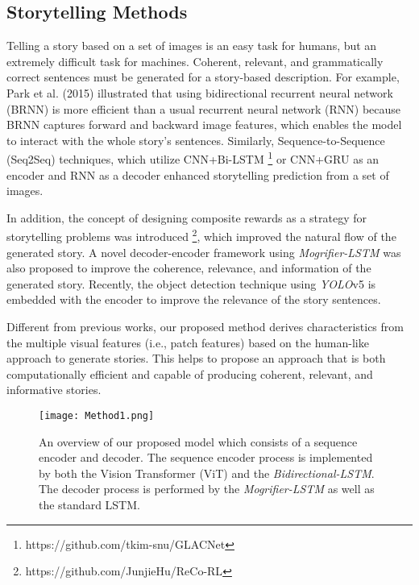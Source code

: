 \documentclass[runningheads]{llncs}
\begin{document}
\subsection{Storytelling Methods}
Telling a story based on a set of images is an easy task for humans, but an extremely difficult task for machines. Coherent, relevant, and grammatically correct sentences must be generated for a story-based description. For example, Park et al. (2015) \cite{park2015expressing} illustrated that using bidirectional recurrent neural network (BRNN) is more efficient than a usual recurrent neural network (RNN) because BRNN captures forward and backward image features, which enables the model to interact with the whole story's sentences. Similarly, Sequence-to-Sequence (Seq2Seq) techniques, which utilize CNN+Bi-LSTM \cite{kim2018glac}\footnote{https://github.com/tkim-snu/GLACNet} or CNN+GRU \cite{wang2018show} as an encoder and RNN as a decoder enhanced storytelling prediction from a set of images.

In addition, the concept of designing composite rewards as a strategy for storytelling problems was introduced \cite{hu2020makes}\footnote{https://github.com/JunjieHu/ReCo-RL}, which improved the natural flow of the generated story. A novel decoder-encoder framework using {\em Mogrifier-LSTM} \cite{visapp21} was also proposed to improve the coherence, relevance, and information of the generated story. Recently, the object detection technique using {\em YOLO}v5 \cite{9647213} is embedded with the encoder to improve the relevance of the story sentences.

Different from previous works, our proposed method derives characteristics from the multiple visual features (i.e., patch features) based on the human-like approach to generate stories. This helps to propose an approach that is both computationally efficient and capable of producing coherent, relevant, and informative stories.

\begin{figure}
\texttt{[image: Method1.png]}
\caption{An overview of our proposed model which consists of a sequence encoder and decoder. The sequence encoder process is implemented by both the Vision Transformer (ViT) and the {\em Bidirectional-LSTM}. The decoder process is performed by the {\em Mogrifier-LSTM} as well as the standard LSTM.} \label{method}
\end{figure}
\end{document}
